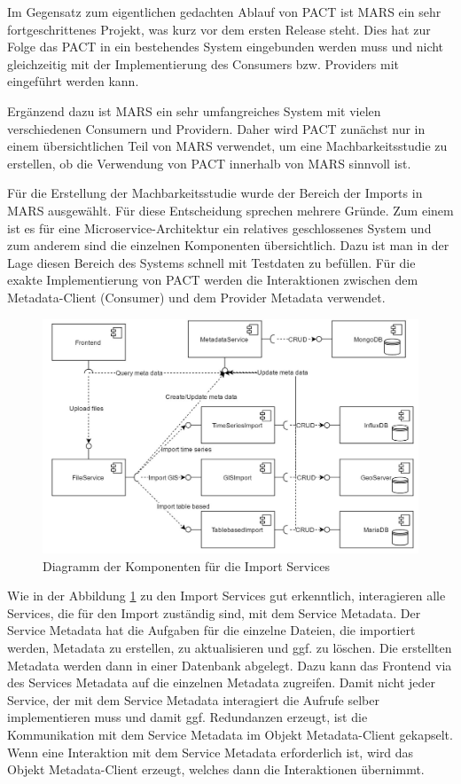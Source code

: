 \documentclass{llncs}
\begin{document}
Im Gegensatz zum eigentlichen gedachten Ablauf von PACT ist MARS ein sehr fortgeschrittenes Projekt, was kurz vor dem ersten Release steht. Dies hat zur Folge das PACT in ein bestehendes System eingebunden werden muss und nicht gleichzeitig mit der Implementierung des Consumers bzw. Providers mit eingeführt werden kann.

Ergänzend dazu ist MARS ein sehr umfangreiches System mit vielen verschiedenen Consumern und Providern. Daher wird PACT zunächst nur in einem übersichtlichen Teil von MARS verwendet, um eine Machbarkeitsstudie zu erstellen, ob die Verwendung von PACT innerhalb von MARS sinnvoll ist.

Für die Erstellung der Machbarkeitsstudie wurde der Bereich der Imports in MARS ausgewählt. Für diese Entscheidung sprechen mehrere Gründe. Zum einem ist es für eine Microservice-Architektur ein relatives geschlossenes System und zum anderem sind die einzelnen Komponenten übersichtlich. Dazu ist man in der Lage diesen Bereich des Systems schnell mit Testdaten zu befüllen. Für die exakte Implementierung von PACT werden die Interaktionen zwischen dem Metadata-Client (Consumer) und dem Provider Metadata verwendet.

\begin{figure}[htbp]
  \centering
      \includegraphics[width=1\textwidth]{./Images/ImportServices}
    \caption{Diagramm der Komponenten für die Import Services}
    \label{fig:ImportServices}
\end{figure}

Wie in der Abbildung \ref{fig:ImportServices} zu den Import Services gut erkenntlich, interagieren alle Services, die für den Import zuständig sind, mit dem Service Metadata. Der Service Metadata hat die Aufgaben für die einzelne Dateien, die importiert werden, Metadata zu erstellen, zu aktualisieren und ggf. zu löschen. Die erstellten Metadata werden dann in einer Datenbank abgelegt. Dazu kann das Frontend via des Services Metadata auf die einzelnen Metadata zugreifen. Damit nicht jeder Service, der mit dem Service Metadata interagiert die Aufrufe selber implementieren muss und damit ggf. Redundanzen erzeugt, ist die Kommunikation mit dem Service Metadata im Objekt Metadata-Client gekapselt. Wenn eine Interaktion mit dem Service Metadata erforderlich ist, wird das Objekt Metadata-Client erzeugt, welches dann die Interaktionen übernimmt.
\end{document}
